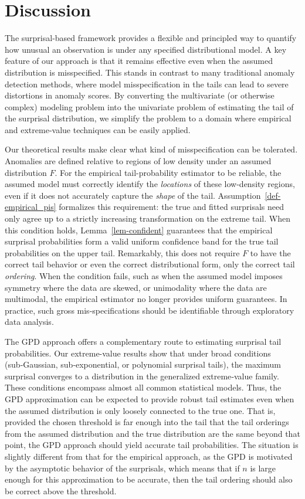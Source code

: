 \documentclass[
  12pt]{article}
\theoremstyle{definition}
\theoremstyle{plain}
\theoremstyle{plain}
\theoremstyle{plain}
\theoremstyle{remark}
\begin{document}
\section{Discussion}\label{sec-discussion}

The surprisal-based framework provides a flexible and principled way to
quantify how unusual an observation is under any specified
distributional model. A key feature of our approach is that it remains
effective even when the assumed distribution is misspecified. This
stands in contrast to many traditional anomaly detection methods, where
model misspecification in the tails can lead to severe distortions in
anomaly scores. By converting the multivariate (or otherwise complex)
modeling problem into the univariate problem of estimating the tail of
the surprisal distribution, we simplify the problem to a domain where
empirical and extreme‑value techniques can be easily applied.

Our theoretical results make clear what kind of misspecification can be
tolerated. Anomalies are defined relative to regions of low density
under an assumed distribution \(F\). For the empirical tail-probability
estimator to be reliable, the assumed model must correctly identify the
\emph{locations} of these low-density regions, even if it does not
accurately capture the \emph{shape} of the tail.
Assumption~\ref{def-empirical_pis} formalizes this requirement: the true
and fitted surprisals need only agree up to a strictly increasing
transformation on the extreme tail. When this condition holds,
Lemma~\ref{lem-confident} guarantees that the empirical surprisal
probabilities form a valid uniform confidence band for the true tail
probabilities on the upper tail. Remarkably, this does not require \(F\)
to have the correct tail behavior or even the correct distributional
form, only the correct tail \emph{ordering}. When the condition fails,
such as when the assumed model imposes symmetry where the data are
skewed, or unimodality where the data are multimodal, the empirical
estimator no longer provides uniform guarantees. In practice, such gross
mis-specifications should be identifiable through exploratory data
analysis.

The GPD approach offers a complementary route to estimating surprisal
tail probabilities. Our extreme-value results show that under broad
conditions (sub‑Gaussian, sub‑exponential, or polynomial surprisal
tails), the maximum surprisal converges to a distribution in the
generalized extreme‑value family. These conditions encompass almost all
common statistical models. Thus, the GPD approximation can be expected
to provide robust tail estimates even when the assumed distribution is
only loosely connected to the true one. That is, provided the chosen
threshold is far enough into the tail that the tail orderings from the
assumed distribution and the true distribution are the same beyond that
point, the GPD approach should yield accurate tail probabilities. The
situation is slightly different from that for the empirical approach, as
the GPD is motivated by the asymptotic behavior of the surprisals, which
means that if \(n\) is large enough for this approximation to be
accurate, then the tail ordering should also be correct above the
threshold.
\end{document}

